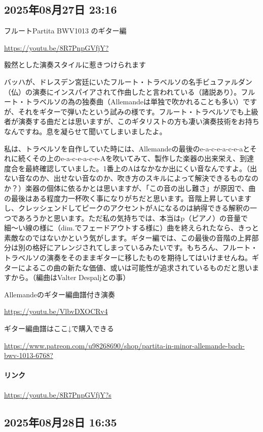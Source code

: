 \subsection*{2025年08月27日 23:16}

フルートPartita BWV1013 のギター編

\url{https://youtu.be/8R7PnpGVfjY?}

毅然とした演奏スタイルに惹きつけられます

バッハが、ドレスデン宮廷にいたフルート・トラベルソの名手ビュファルダン（仏）の演奏にインスパイアされて作曲したと言われている（諸説あり）。フルート・トラベルソの為の独奏曲（Allemandeは単独で吹かれることも多い）ですが、それをギターで弾いたという試みの様です。フルート・トラベルソでも上級者が演奏する曲だとは思いますが、このギタリストの方も凄い演奏技術をお持ちなんですね。息を凝らせて聞いてしまいましたよ。

私は、トラベルソを自作していた時には、Allemandeの最後のe-a-c-e-a-c-e-aとそれに続くその上のe-a-c-e-a-c-e-Aを吹いてみて、製作した楽器の出来栄え、到達度合を最終確認していました。1番上のAはなかなか出にくい音なんですよ。（出ない音なのか、出せない音なのか、吹き方のスキルによって解決できるものなのか？）楽器の個体に依るかとは思いますが、「この音の出し難さ」が原因で、曲の最後はある程度力一杯吹く事になりがちだと思います。音階上昇していますし、クレッシェンドしてピークのアクセントがAになるのは納得できる解釈の一つであろうかと思います。ただ私の気持ちでは、本当はp（ピアノ）の音量で細〜い線の様に（dim.でフェードアウトする様に）曲を終えられたなら、きっと素敵なのではないかという気がします。ギター編では、この最後の音階の上昇部分は別の格好にアレンジされてしまっているみたいです。もちろん、フルート・トラベルソの演奏をそのままギターに移したものを期待してはいけませんね。ギターによるこの曲の新たな価値、或いは可能性が追求されているものだと思いますから。（編曲はValter Despaljとの事）

Allemandeのギター編曲譜付き演奏

\url{https://youtu.be/VlbvDXOCRv4}

ギター編曲譜はここ↓で購入できる

\url{https://www.patreon.com/u98268690/shop/partita-in-minor-allemande-bach-bwv-1013-6768?}

\paragraph{リンク}
\url{https://youtu.be/8R7PnpGVfjY?s}

\subsection*{2025年08月28日 16:35}

